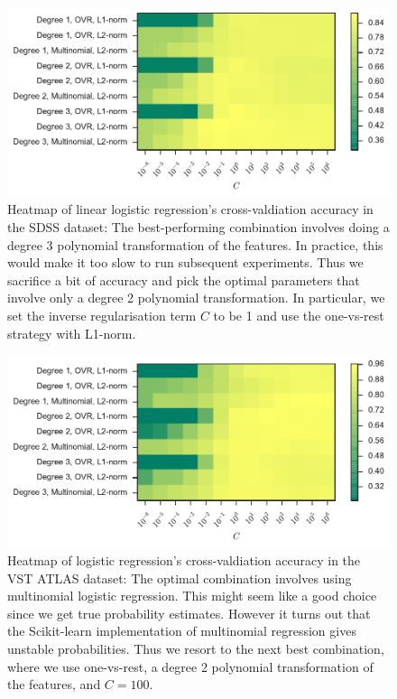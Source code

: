 \begin{figure}[p]
	\centering
	\includegraphics[width=\textwidth]{figures/4_expt1/sdss_grid_logistic}
	\caption[Heatmap of logistic regression's cross-valdiation accuracy in SDSS]{
		Heatmap of linear logistic regression's cross-valdiation accuracy in the SDSS dataset:
		The best-performing combination involves doing a degree 3 polynomial transformation
		of the features. In practice, this would make it too slow to run subsequent experiments.
		Thus we sacrifice a bit of accuracy and pick the optimal parameters that
		involve only a degree 2 polynomial transformation. In particular, we set the inverse regularisation
		term $C$ to be 1 and use the one-vs-rest strategy with L1-norm.}
	\label{fig:sdss_grid_logistic}
\end{figure}

\begin{figure}[p]
	\centering
	\includegraphics[width=\textwidth]{figures/4_expt1/vstatlas_grid_logistic}
	\caption[Heatmap of logistic regression's cross-valdiation accuracy in VST ATLAS]{
		Heatmap of logistic regression's cross-valdiation accuracy in the VST ATLAS dataset:
		The optimal combination involves using multinomial logistic regression. This
		might seem like a good choice since we get true probability estimates. However
		it turns out that the Scikit-learn implementation of multinomial regression
		gives unstable probabilities. Thus we resort to the next best combination,
		where we use one-vs-rest, a degree 2 polynomial transformation of the features, and $C = 100$. }
	\label{fig:vstatlas_grid_logistic}
\end{figure}

